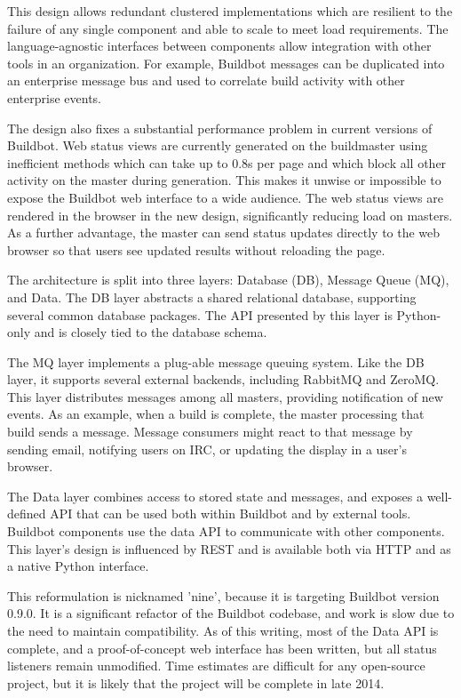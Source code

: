\documentclass[conference]{IEEEtran}
\begin{document}
This design allows redundant clustered implementations which are resilient to the failure of any single component and able to scale to meet load requirements.
The language-agnostic interfaces between components allow integration with other tools in an organization.
For example, Buildbot messages can be duplicated into an enterprise message bus and used to correlate build activity with other enterprise events.

The design also fixes a substantial performance problem in current versions of Buildbot.
Web status views are currently generated on the buildmaster using inefficient methods which can take up to 0.8s per page and which block all other activity on the master during generation.
This makes it unwise or impossible to expose the Buildbot web interface to a wide audience.
The web status views are rendered in the browser in the new design, significantly reducing load on masters.
As a further advantage, the master can send status updates directly to the web browser so that users see updated results without reloading the page.

The architecture is split into three layers: Database (DB), Message Queue (MQ), and Data.
The DB layer abstracts a shared relational database, supporting several common database packages.
The API presented by this layer is Python-only and is closely tied to the database schema.

The MQ layer implements a plug-able message queuing system.
Like the DB layer, it supports several external backends, including RabbitMQ and ZeroMQ.
This layer distributes messages among all masters, providing notification of new events.
As an example, when a build is complete, the master processing that build sends a message.
Message consumers might react to that message by sending email, notifying users on IRC, or updating the display in a user's browser.

The Data layer combines access to stored state and messages, and exposes a well-defined API that can be used both within Buildbot and by external tools.
Buildbot components use the data API to communicate with other components.
This layer's design is influenced by REST and is available both via HTTP and as a native Python interface.

This reformulation is nicknamed 'nine', because it is targeting Buildbot version 0.9.0.
It is a significant refactor of the Buildbot codebase, and work is slow due to the need to maintain compatibility.
As of this writing, most of the Data API is complete, and a proof-of-concept web interface has been written, but all status listeners remain unmodified.
Time estimates are difficult for any open-source project, but it is likely that the project will be complete in late 2014.
\end{document}
